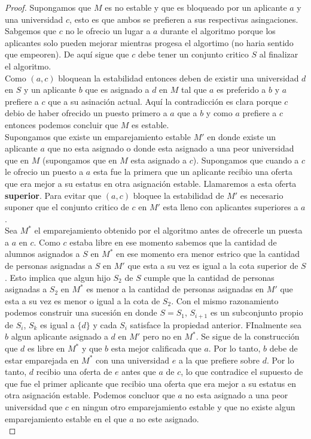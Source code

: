 \begin{proof}
Supongamos que $M$ es no estable y que es bloqueado por un aplicante $a$ y una universidad $c$, esto es que ambos se prefieren a sus respectivas asingaciones. Sabgemos que $c$ no le ofrecio un lugar a $a$ durante el algoritmo porque los aplicantes solo pueden mejorar mientras progesa el algortimo (no haria sentido que empeoren). De aquí sigue que $c$ debe tener un conjunto critico $S$ al finalizar el algoritmo.\\
Como $(a,c)$ bloquean la estabilidad entonces deben de existir una universidad $d$ en $S$ y un aplicante $b$ que es asignado a $d$ en $M$ tal que $a$ es preferido a $b$ y $a$ prefiere a $c$ que a su asinación actual. Aquí la contradicción es clara porque $c$ debio de haber ofrecido un puesto primero a $a$ que a $b$ y como $a$ prefiere a $c$ entonces podemos concluir que $M$ es estable. \\
Supongamos que existe un emparejamiento estable $M'$ en donde existe un aplicante $a$ que no esta asignado o donde esta asignado a una peor universidad que en $M$ (supongamos que en $M$ esta asignado a $c$). Supongamos que cuando a $c$ le ofrecio un puesto a $a$ esta fue la primera que un aplicante recibio una oferta que era mejor a su estatus en otra asignación estable. Llamaremos a esta oferta \textbf{superior}. Para evitar que $(a,c)$ bloquee la estabilidad de $M'$ es necesario suponer que el conjunto critico de $c$ en $M'$ esta lleno con aplicantes superiores a $a$. \\
Sea $M^*$ el emparejamiento obtenido por el algoritmo antes de ofrecerle un puesta a $a$ en $c$. Como $c$ estaba libre en ese momento sabemos que la cantidad de alumnos asignados a $S$ en $M^*$ en ese momento era menor estrico que la cantidad de personas asignadas a $S$ en $M'$ que esta a su vez es igual a la cota superior de $S$. Esto implica que algun hijo $S_2$ de $S$ cumple que la cantidad de personas asignadas a $S_2$ en $M^*$ es menor a la cantidad de personas asignadas en $M'$ que esta a su vez es menor o igual a la cota de $S_2$. Con el mismo razonamiento podemos construir una sucesión en donde $S=S_1$, $S_{i+1}$ es un subconjunto propio de $S_i$, $S_{k}$ es igual a $\{d\}$ y cada $S_i$ satisface la propiedad anterior. FInalmente sea $b$ algun aplicante asignado a $d$ en $M'$ pero no en $M^*$. Se sigue de la construcción que $d$ es libre en $M^*$ y que $b$ esta mejor calificada que $a$. Por lo tanto, $b$ debe de estar emparejada en $M^*$ con una universidad $e$ a la que prefiere sobre $d$. Por lo tanto, $d$ recibio una oferta de $e$ antes que $a$ de $c$, lo que contradice el supuesto de que fue el primer aplicante que recibio una oferta que era mejor a su estatus en otra asignación estable. Podemos concluor que $a$ no esta asignado a una peor universidad que $c$ en ningun otro emparejamiento estable y que no existe algun emparejamiento estable en el que $a$ no este asignado. \\

\end{proof}
